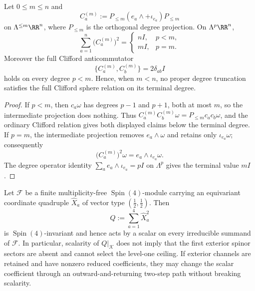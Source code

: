 \documentclass[11pt]{article}
\begin{document}
\begin{proposition}
\label{p1:prop:terminal-degree-leakage}
Let \(0\le m\le n\) and
\[
 C_a^{(m)}:=P_{\le m}(e_a\wedge+\iota_{e_a})P_{\le m}
\]
on \(\Lambda^{\le m}\RR^n\), where \(P_{\le m}\) is the orthogonal degree
projection.  On \(\Lambda^p\RR^n\),
\[
 \sum_{a=1}^n\bigl(C_a^{(m)}\bigr)^2
 =
 \begin{cases}
 nI,&p<m,\\[2mm]
 mI,&p=m.
 \end{cases}
\]
Moreover the full Clifford anticommutator
\[
 \{C_a^{(m)},C_b^{(m)}\}=2\delta_{ab}I
\]
holds on every degree \(p<m\).  Hence, when \(m<n\), no proper degree
truncation satisfies the full Clifford sphere relation on its terminal
degree.
\end{proposition}

\begin{proof}
If \(p<m\), then \(c_a\omega\) has degrees \(p-1\) and \(p+1\), both at most
\(m\), so the intermediate projection does nothing.  Thus
\(C_a^{(m)}C_b^{(m)}\omega=P_{\le m}c_ac_b\omega\), and the ordinary Clifford
relation gives both displayed claims below the terminal degree.  If \(p=m\),
the intermediate projection removes \(e_a\wedge\omega\) and retains only
\(\iota_{e_a}\omega\); consequently
\[
 \bigl(C_a^{(m)}\bigr)^2\omega
 =e_a\wedge\iota_{e_a}\omega.
\]
The degree operator identity
\(\sum_ae_a\wedge\iota_{e_a}=pI\) on \(\Lambda^p\) gives the terminal value
\(mI\).
\end{proof}

\begin{proposition}
\label{p1:prop:quadratic-coordinate-scalarity-no-selector}
Let \(\mathcal F\) be a finite multiplicity-free \(\operatorname{Spin}(4)\)-module carrying
an equivariant coordinate quadruple \(\widehat X_a\) of vector type
\((\tfrac12,\tfrac12)\).  Then
\[
 Q:=\sum_{a=1}^4\widehat X_a^2
\]
is \(\operatorname{Spin}(4)\)-invariant and hence acts by a scalar on every irreducible
summand of \(\mathcal F\).  In particular, scalarity of
\(Q|_{\mathcal K}\) does not imply that the first exterior spinor sectors are
absent and cannot select the level-one ceiling.  If exterior channels are
retained and have nonzero reduced coefficients, they may change the scalar
coefficient through an outward-and-returning two-step path without breaking
scalarity.
\end{proposition}
\end{document}
